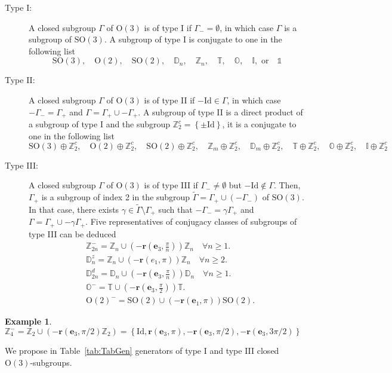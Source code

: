 \documentclass[11pt,a4paper]{amsart}
\theoremstyle{definition}
\newtheorem{exmp}[thm]{Example}
\newcommand{\ZZ}{\mathbb{Z}}                %
\newcommand{\OO}{\mathrm{O}}                %
\newcommand{\SO}{\mathrm{SO}}               %
\newcommand{\octa}{\mathbb{O}}              %
\newcommand{\ico}{\mathbb{I}}               %
\newcommand{\tetra}{\mathbb{T}}             %
\newcommand{\DD}{\mathbb{D}}                %
\newcommand{\1}{\mathds{1}}		            %
\newcommand{\id}{\mathrm{Id}}                %
\newcommand{\ee}{\pmb{e}}                   %
\newcommand{\vR}{\mathbf{r}}
\newcommand{\set}[1]{\left\{#1\right\}}     %
\newcommand{\Dnz}{\DD_n^z}
\newcommand{\Dnd}{\DD_{2n}^d}
\begin{document}
\begin{description}
	\item[Type I:] A closed subgroup $\Gamma$ of $\OO(3)$ is of type I if $\Gamma_-=\emptyset$, in which case $\Gamma$ is a subgroup of $\SO(3)$. A subgroup of type I is conjugate to one in the following list
	\begin{equation*}
	\SO(3),\quad \OO(2),\quad \SO(2), \quad \DD_n, \quad \ZZ_n, \quad \tetra, \quad \octa, \quad \ico, \text{ or} \quad \mathds{1}
	\end{equation*}
	\item[Type II:] A closed subgroup $\Gamma$ of $\OO(3)$ is of type II if $-\id \in \Gamma$, in which case $-\Gamma_-=\Gamma_+$ and $\Gamma=\Gamma_+\cup -\Gamma_+$. A subgroup of type II is a direct product of a subgroup of type I and the subgroup $\ZZ_2^c=\set{\pm \id}$, it is a conjugate to one in the following list
	\begin{equation*}
	\SO(3)\oplus \ZZ_2^c,\quad \OO(2)\oplus \ZZ_2^c,\quad \SO(2)\oplus \ZZ_2^c,\quad \ZZ_m\oplus \ZZ_2^c,\quad \DD_m\oplus \ZZ_2^c,\quad \tetra\oplus \ZZ_2^c,\quad \octa\oplus \ZZ_2^c, \quad \ico\oplus \ZZ_2^c
	\end{equation*}
	\item[Type III:] A closed subgroup $\Gamma$ of $\OO(3)$ is of type III if $\Gamma_-\neq \emptyset$ but $-\id \notin \Gamma$. Then, $\Gamma_+$ is a subgroup of index 2 in the subgroup $\tilde{\Gamma}=\Gamma_+\cup (-\Gamma_-)$ of $\SO(3)$. In that case, there exists $\gamma \in \tilde{\Gamma}\setminus \Gamma_+$ such that $-\Gamma_- = \gamma \Gamma_+$ and $\Gamma=\Gamma_+\cup -\gamma \Gamma_+$. Five representatives of conjugacy classes of subgroups of type III can be deduced
	\begin{align} \label{typeIII}
	& \ZZ_{2n}^-=\ZZ_n \cup (-\vR(\ee_3,\frac{\pi}{n})) \ZZ_n \quad \forall n \geq 1. \\
	& \Dnz=\ZZ_n \cup (-\vR(e_1,\pi))\ZZ_n  \quad \forall n\geq2.                     \\
	& \Dnd=\DD_n \cup (-\vR(\ee_3,\frac{\pi}{n})) \DD_n \quad \forall n \geq 1.       \\
	& \octa^-=\tetra \cup (-\vR(\ee_3,\frac{\pi}{2})) \tetra.                         \\
	& \OO(2)^-=\SO(2)\cup (-\vR(\ee_1,\pi)) \SO(2).
	\end{align}
\end{description}




\begin{exmp}\label{exmp:1}
  $    \ZZ_4^-  =\ZZ_2\cup\left(-\vR(\ee_3,\pi/2)\ZZ_2\right) =\set{\id,\vR(\ee_3,\pi),-\vR(\ee_3,\pi/2),-\vR(\ee_3,3 \pi/2)}
  $
\end{exmp}
We propose in Table~\ref{tab:TabGen} generators of type I and type III closed $\OO(3)$-subgroups.
\end{document}
